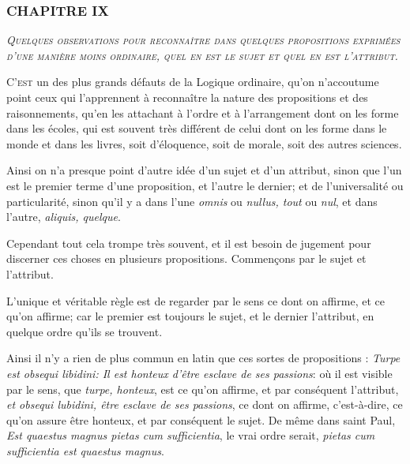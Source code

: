 \subsubsection{\centering \Large CHAPITRE IX}
\begin{center}\emph{\large\scshape Quelques observations pour reconnaître dans quelques propositions exprimées d'une manière moins ordinaire, quel en est le sujet et quel en est l'attribut.}\end{center}

	\lettrine{C}{'est} un des plus grands défauts de la Logique ordinaire, qu'on n'accoutume point ceux qui l'apprennent à reconnaître la nature des propositions et des raisonnements, qu'en les attachant à l'ordre et à l'arrangement dont on les forme dans les écoles, qui est souvent très différent de celui dont on les forme dans le monde et dans les livres, soit d'éloquence, soit de morale, soit des autres sciences.

Ainsi on n'a presque point d'autre idée d'un sujet et d'un attribut, sinon que l'un est le premier terme d'une proposition, et l'autre le dernier; et de l'universalité ou particularité, sinon qu'il y a dans l'une \emph{omnis} ou \emph{nullus, tout} ou \emph{nul}, et dans l'autre, \emph{aliquis, quelque}.

Cependant tout cela trompe très souvent, et il est besoin de jugement pour discerner ces choses en plusieurs propositions. Commençons par le sujet et l'attribut.

L'unique et véritable règle est de regarder par le sens ce dont on affirme, et ce qu'on affirme; car le premier est toujours le sujet, et le dernier l'attribut, en quelque ordre qu'ils se trouvent.

Ainsi il n'y a rien de plus commun en latin que ces sortes de propositions : \emph{Turpe est obsequi libidini: Il est honteux d'être esclave de ses passions}: où il est visible par le sens, que \emph{turpe, honteux}, est ce qu'on affirme, et par conséquent l'attribut, \emph{et obsequi lubidini, être esclave de ses passions}, ce dont on affirme, c'est-à-dire, ce qu'on assure être honteux, et par conséquent le sujet. De même dans saint Paul, \emph{Est quaestus magnus pietas cum sufficientia}, le vrai ordre serait, \emph{pietas cum sufficientia est quaestus magnus}.


